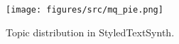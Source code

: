\begin{figure}
    \centering
    \texttt{[image: figures/src/mq\_pie.png]}
    \caption{Topic distribution in StyledTextSynth.}
    \label{fig:mq_pie}
\end{figure}